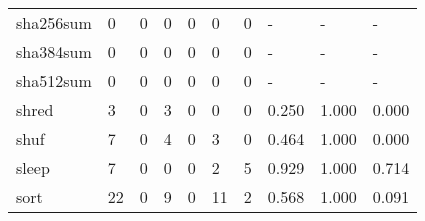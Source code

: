 \begin{longtable}{lp{2.0cm}p{2.0cm}p{2.0cm}p{2.0cm}p{2.0cm}p{2.0cm}p{2.0cm}p{2.0cm}p{2.0cm}}
sha256sum &                      0 &                                  0 &                                 0 &                                0 &                                 0 &                               0 &                                    - &                                      - &                                    - \\
sha384sum &                      0 &                                  0 &                                 0 &                                0 &                                 0 &                               0 &                                    - &                                      - &                                    - \\
sha512sum &                      0 &                                  0 &                                 0 &                                0 &                                 0 &                               0 &                                    - &                                      - &                                    - \\
shred     &                      3 &                                  0 &                                 3 &                                0 &                                 0 &                               0 &                                0.250 &                                  1.000 &                                0.000 \\
shuf      &                      7 &                                  0 &                                 4 &                                0 &                                 3 &                               0 &                                0.464 &                                  1.000 &                                0.000 \\
sleep     &                      7 &                                  0 &                                 0 &                                0 &                                 2 &                               5 &                                0.929 &                                  1.000 &                                0.714 \\
sort      &                     22 &                                  0 &                                 9 &                                0 &                                11 &                               2 &                                0.568 &                                  1.000 &                                0.091 \\

\end{longtable}
